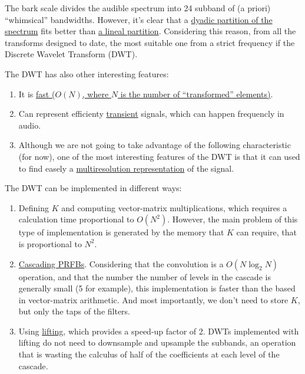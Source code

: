 The bark scale divides the audible spectrum into 24 subband of (a
priori) ``whimsical'' bandwidths. However, it's clear that a
\href{https://en.wikipedia.org/wiki/Octave_band}{dyadic partition of
  the spectrum} fits better than
\href{https://en.wikipedia.org/wiki/Wavelet_transform#Principle}{a
  lineal partition}. Considering this reason, from all the transforms
designed to date, the most suitable one from a strict frequency if the
Discrete Wavelet Transform (DWT).

The DWT has also other interesting features:
\begin{enumerate}
\item It is
  \href{https://en.wikipedia.org/wiki/Discrete_wavelet_transform#Time_complexity}{fast
    ($O(N)$, where $N$ is the number of ``transformed'' elements)}.
\item Can represent efficienty
  \href{https://en.wikipedia.org/wiki/Transient_(oscillation)}{transient}
  signals, which can happen frequencly in audio.
\item Although we are not going to take advantage of the following
  characteristic (for now), one of the most interesting features of
  the DWT is that it can used to find easely a
  \href{https://en.wikipedia.org/wiki/Multiresolution_analysis}{multiresolution
    representation} of the signal.
\end{enumerate}

The DWT can be implemented in different ways:
\begin{enumerate}
\item Defining $K$ and computing vector-matrix multiplications, which
  requires a calculation time proportional to $O(N^2)$. However, the
  main problem of this type of implementation is generated by the
  memory that $K$ can require, that is proportional to $N^2$.
\item
  \href{https://en.wikipedia.org/wiki/Discrete_wavelet_transform#Cascading_and_filter_banks}{Cascading
    PRFBs}. Considering that the convolution is a $O(N\log_2N)$
  operation, and that the number the number of levels in the cascade
  is generally small (5 for example), this implementation is faster
  than the based in vector-matrix arithmetic. And most importantly, we
  don't need to store $K$, but only the taps of the filters.
\item Using
  \href{https://en.wikipedia.org/wiki/Lifting_scheme}{lifting}, which
  provides a speed-up factor of 2. DWTs implemented with lifting do
  not need to downsample and upsample the subbands, an operation that
  is wasting the calculus of half of the coefficients at each level of
  the cascade.
\end{enumerate}

